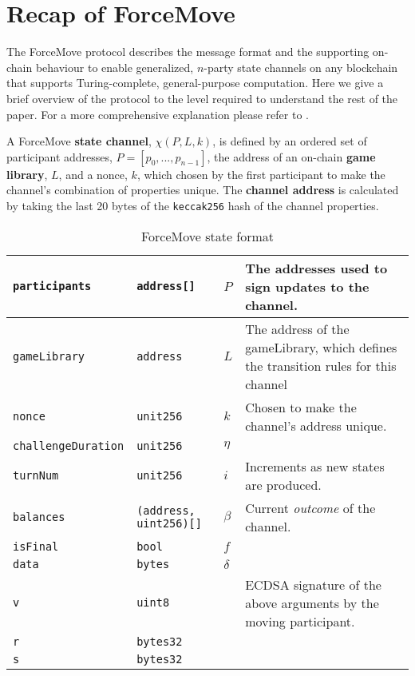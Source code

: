 
\usepackage{stmaryrd}

\newcommand{\adj}[1]{\llbracket #1 \rrbracket} 
\newcommand{\enf}[1]{[#1]} 



\maketitle

\section{Recap of ForceMove}

The ForceMove protocol describes the message format and the supporting on-chain behaviour
to enable generalized, $n$-party state channels on any blockchain that supports Turing-complete, general-purpose
computation. Here we give a brief overview of the protocol to the level required to understand
the rest of the paper. For a more comprehensive explanation please refer to \cite{}.

A ForceMove \textbf{state channel}, $\chi(P, L, k)$, is defined by an ordered set of participant
addresses, $P = [p_0, ..., p_{n-1}]$, the address of an on-chain \textbf{game library}, $L$,
and a nonce, $k$, which chosen by the first participant to make the channel's combination of properties unique.
The \textbf{channel address} is calculated by taking the last 20 bytes of the \texttt{keccak256}
hash of the channel properties. 

\begin{table}[h]
  \begin{tabular}{|l|l|l|p{5cm}|}
    \hline
    \texttt{participants} & \texttt{address[]} & $P$ & The addresses used to sign updates to the channel. \\ \hline
    \texttt{gameLibrary} & \texttt{address} & $L$ & The address of the gameLibrary, which defines the transition rules for this channel \\ \hline
    \texttt{nonce} & \texttt{unit256} & $k$ & Chosen to make the channel's address unique. \\ \hline
    \texttt{challengeDuration} & \texttt{unit256} & $\eta$ & \\ \hline
    \texttt{turnNum} & \texttt{unit256} & $i$ & Increments as new states are produced. \\ \hline
    \texttt{balances} & \texttt{(address, uint256)[]} & $\beta$ & Current \textit{outcome} of the channel. \\ \hline
    \texttt{isFinal} & \texttt{bool} & $f$ & \\ \hline
    \texttt{data} & \texttt{bytes} & $\delta$ & \\ \hline
    \texttt{v} & \texttt{uint8} & &  ECDSA signature of the above arguments by the moving participant. \\ \cline{1-2}
    \texttt{r} & \texttt{bytes32} & & \\ \cline{1-2}
    \texttt{s} & \texttt{bytes32} & & \\ \hline
  \end{tabular}
  \caption{ForceMove state format}
  \label{table:force-move-state}
\end{table}

